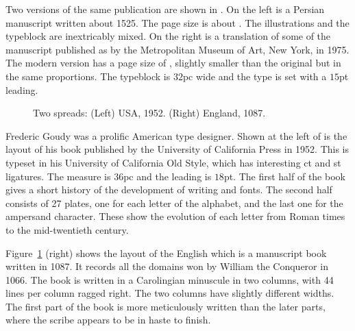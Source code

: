 \documentclass[10pt,a4paper,oneside,extrafontsizes]{memoir}%
\begin{document}
\begin{paracol}{2}
\switchEng
     Two versions of the same publication are shown in .
On the left is a Persian manuscript  written
about 1525. The page size is about . The 
illustrations and
the typeblock are inextricably mixed. On the right is a translation of
some of the manuscript published as 
by the Metropolitan Museum of Art, New York, in 1975. The modern version
has a page size of , slightly smaller than the original
but in the same proportions. The typeblock is $32$pc wide 
and the type is set with a $15$pt leading.
\end{paracol}

\begin{figure}
\centering
\begin{minipage}[b]{\pwlayi}
\end{minipage}
\hfill
\begin{minipage}[b]{\pwlayi}
\end{minipage}
\caption[Two spreads: USA, 1952 and England, 1087]%
        {Two spreads: (Left) USA, 1952.
         (Right) England, 1087.} \label{fb:11}
\end{figure}

\begin{paracol}{2}
\switchEng
    Frederic Goudy was a prolific American 
type designer. Shown at the left of
 is the layout of his book  published by the University of California Press in 1952.
This is typeset in his University of California Old 
Style, which has
interesting ct and st ligatures. The measure is $36$pc and the leading
is $18$pt. The first half of the book gives a short history of the development
of writing and fonts. The second half consists of 27 plates, one for each 
letter of the alphabet, and the last one for the ampersand character. These 
show the evolution of each letter from Roman times to the mid-twentieth
century.


    Figure~\ref{fb:11} (right) shows the layout of the English 
 which is a manuscript book written in 1087. 
It records all the domains won by William the Conqueror in 1066. 
The book is written in a Carolingian minuscule
in two columns, with 44 lines per column ragged right. 
The two columns have slightly different widths. The first part of the book 
is more meticulously written than the later parts, where the scribe appears 
to be in haste to finish.
\end{paracol}
\end{document}
